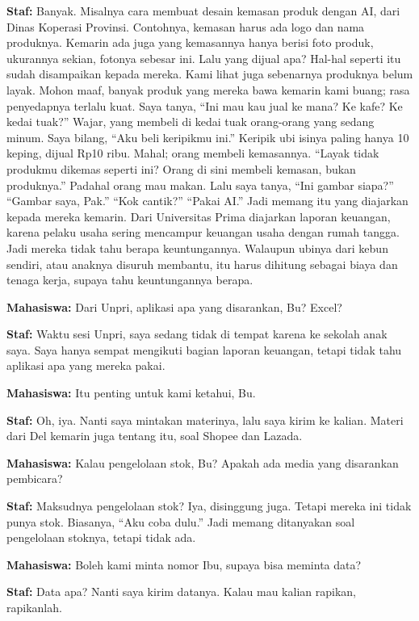 {\noindent \textbf{Staf:} Banyak. Misalnya cara membuat desain kemasan produk dengan AI, dari Dinas Koperasi Provinsi. Contohnya, kemasan harus ada logo dan nama produknya. Kemarin ada juga yang kemasannya hanya berisi foto produk, ukurannya sekian, fotonya sebesar ini. Lalu yang dijual apa? Hal-hal seperti itu sudah disampaikan kepada mereka. Kami lihat juga sebenarnya produknya belum layak. Mohon maaf, banyak produk yang mereka bawa kemarin kami buang; rasa penyedapnya terlalu kuat. Saya tanya, ``Ini mau kau jual ke mana? Ke kafe? Ke kedai tuak?'' Wajar, yang membeli di kedai tuak orang-orang yang sedang minum. Saya bilang, ``Aku beli keripikmu ini.'' Keripik ubi isinya paling hanya 10 keping, dijual Rp10 ribu. Mahal; orang membeli kemasannya. ``Layak tidak produkmu dikemas seperti ini? Orang di sini membeli kemasan, bukan produknya.'' Padahal orang mau makan. Lalu saya tanya, ``Ini gambar siapa?'' ``Gambar saya, Pak.'' ``Kok cantik?'' ``Pakai AI.'' Jadi memang itu yang diajarkan kepada mereka kemarin. Dari Universitas Prima diajarkan laporan keuangan, karena pelaku usaha sering mencampur keuangan usaha dengan rumah tangga. Jadi mereka tidak tahu berapa keuntungannya. Walaupun ubinya dari kebun sendiri, atau anaknya disuruh membantu, itu harus dihitung sebagai biaya dan tenaga kerja, supaya tahu keuntungannya berapa.

\noindent \textbf{Mahasiswa:} Dari Unpri, aplikasi apa yang disarankan, Bu? Excel?

\noindent \textbf{Staf:} Waktu sesi Unpri, saya sedang tidak di tempat karena ke sekolah anak saya. Saya hanya sempat mengikuti bagian laporan keuangan, tetapi tidak tahu aplikasi apa yang mereka pakai.

\noindent \textbf{Mahasiswa:} Itu penting untuk kami ketahui, Bu.

\noindent \textbf{Staf:} Oh, iya. Nanti saya mintakan materinya, lalu saya kirim ke kalian. Materi dari Del kemarin juga tentang itu, soal Shopee dan Lazada.

\noindent \textbf{Mahasiswa:} Kalau pengelolaan stok, Bu? Apakah ada media yang disarankan pembicara?

\noindent \textbf{Staf:} Maksudnya pengelolaan stok? Iya, disinggung juga. Tetapi mereka ini tidak punya stok. Biasanya, ``Aku coba dulu.'' Jadi memang ditanyakan soal pengelolaan stoknya, tetapi tidak ada.

\noindent \textbf{Mahasiswa:} Boleh kami minta nomor Ibu, supaya bisa meminta data?

\noindent \textbf{Staf:} Data apa? Nanti saya kirim datanya. Kalau mau kalian rapikan, rapikanlah.

}
